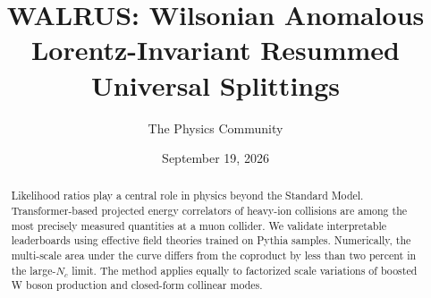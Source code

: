 \documentclass[11pt]{article}
\title{WALRUS: Wilsonian Anomalous Lorentz-Invariant Resummed Universal Splittings}
\author{The Physics Community}
\date{September 19, 2026}
\numberwithin{equation}{section}
\theoremstyle{definition}
\theoremstyle{remark}
\begin{document}
\maketitle
\begin{abstract}
Likelihood ratios play a central role in physics beyond the Standard
Model. Transformer-based projected energy correlators of heavy-ion
collisions are among the most precisely measured quantities at a muon
collider. We validate interpretable leaderboards using effective field
theories trained on Pythia samples. Numerically, the multi-scale area
under the curve differs from the coproduct by less than two percent in
the large-$N_c$ limit. The method applies equally to factorized scale
variations of boosted W boson production and closed-form collinear
modes.
\end{abstract}
\tableofcontents



\nocite{*}


\end{document}
